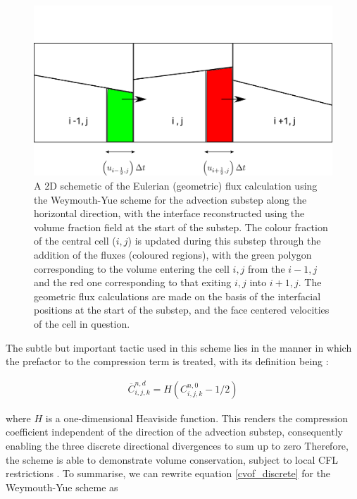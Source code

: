 \begin{figure}[!h]
\includegraphics[width=1.0\textwidth]{plots/methodology/wy.png} 
\caption{ A 2D schemetic of the Eulerian (geometric) flux calculation  
using the Weymouth-Yue \cite{wy} scheme for the advection substep
along the horizontal direction, with the interface reconstructed 
using the volume fraction field at the start of the substep.
The colour fraction of the central cell ($i,j$) is updated during this substep
through the addition of the fluxes (coloured regions), with the green polygon corresponding
to the volume entering the cell $i,j$ from the $i-1,j$ and the red one corresponding to
that exiting $i,j$ into $i+1,j$. The geometric flux calculations are made on the basis
of the interfacial positions at the start of the substep, and the face centered velocities 
of the cell in question.}
\label{fig:wy}
\end{figure}

The subtle but important tactic used in this scheme lies in the manner in which the 
prefactor to the compression term   is treated, with its definition being : 

\begin{align}
\overline{C}_{i,j,k}^{n,d} = H \left( C_{i,j,k}^{n,0} - 1/2 \right)
\label{wy_cond}
\end{align}

where $H$ is a one-dimensional Heaviside function. This renders the compression coefficient 
independent of the direction of the advection substep, consequently enabling the 
three discrete directional divergences to sum up to zero 
Therefore, the scheme is able to demonstrate volume conservation, subject to local 
CFL restrictions . To summarise, we can rewrite equation \ref{cvof_discrete}
for the Weymouth-Yue scheme as  

